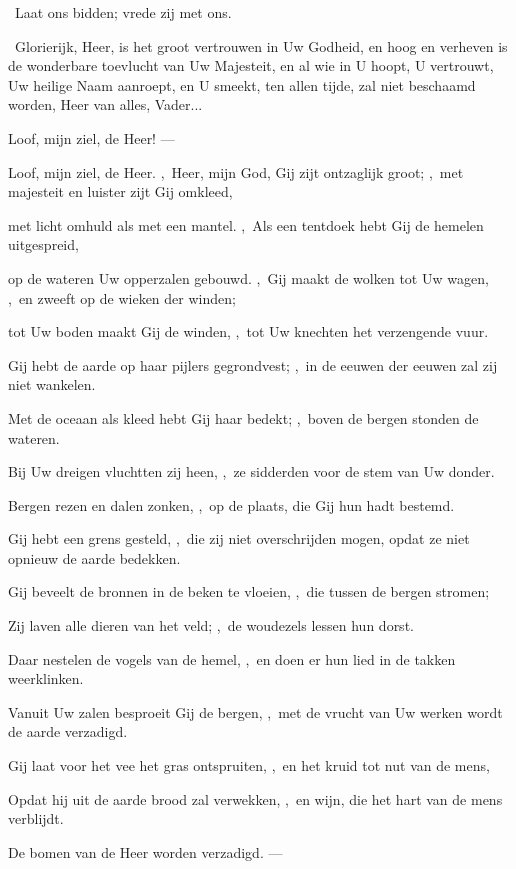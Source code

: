 \documentclass[12pt,twoside,a5paper]{article}
\begin{document}
\dd\ Laat ons bidden; vrede zij met ons.

\cc\ Glorierijk, Heer, is het groot vertrouwen in Uw Godheid, en hoog en verheven is de wonderbare toevlucht van Uw Majesteit, en al wie in U hoopt, U vertrouwt, Uw heilige Naam aanroept, en U smeekt, ten allen tijde, zal niet beschaamd worden, Heer van alles, Vader...

\begin{halfparskip}
   Loof, mijn ziel, de Heer! --- 

  Loof, mijn ziel, de Heer. \sep\ Heer, mijn God, Gij zijt ontzaglijk groot; \sep\ met majesteit en luister zijt Gij omkleed,

  met licht omhuld als met een mantel. \sep\ Als een tentdoek hebt Gij de hemelen uitgespreid,

  op de wateren Uw opperzalen gebouwd. \sep\ Gij maakt de wolken tot Uw wagen, \sep\ en zweeft op de wieken der winden;

  tot Uw boden maakt Gij de winden, \sep\ tot Uw knechten het verzengende vuur.

  Gij hebt de aarde op haar pijlers gegrondvest; \sep\ in de eeuwen der eeuwen zal zij niet wankelen.

  Met de oceaan als kleed hebt Gij haar bedekt; \sep\ boven de bergen stonden de wateren.

  Bij Uw dreigen vluchtten zij heen, \sep\ ze sidderden voor de stem van Uw donder.

  Bergen rezen en dalen zonken, \sep\ op de plaats, die Gij hun hadt bestemd.

  Gij hebt een grens gesteld, \sep\ die zij niet overschrijden mogen, opdat ze niet opnieuw de aarde bedekken.

  Gij beveelt de bronnen in de beken te vloeien, \sep\ die tussen de bergen stromen;

  Zij laven alle dieren van het veld; \sep\ de woudezels lessen hun dorst.

  Daar nestelen de vogels van de hemel, \sep\ en doen er hun lied in de takken weerklinken.

  Vanuit Uw zalen besproeit Gij de bergen, \sep\ met de vrucht van Uw werken wordt de aarde verzadigd.

  Gij laat voor het vee het gras ontspruiten, \sep\ en het kruid tot nut van de mens,

  Opdat hij uit de aarde brood zal verwekken, \sep\ en wijn, die het hart van de mens verblijdt.

  De bomen van de Heer worden verzadigd. --- 
\end{halfparskip}
\end{document}
